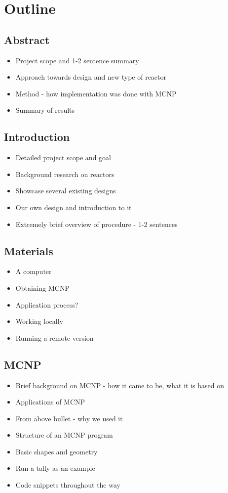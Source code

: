 \documentclass[12pt,a4paper]{article}
\begin{document}
\section*{Outline}
\renewcommand{\thesubsection}{\arabic{subsection}}
\subsection{Abstract}
\begin{itemize}
	\item Project scope and 1-2 sentence summary
	\item Approach towards design and new type of reactor
	\item Method - how implementation was done with MCNP
	\item Summary of results
\end{itemize}
\subsection{Introduction}
\begin{itemize}
	\item Detailed project scope and goal
	\item Background research on reactors
	\item Showcase several existing designs
	\item Our own design and introduction to it
	\item Extremely brief overview of procedure - 1-2 sentences
\end{itemize}
\subsection{Materials}
\begin{itemize}
	\item A computer
	\item Obtaining MCNP
	\item Application process?
	\item Working locally
	\item Running a remote version
\end{itemize}
\subsection{MCNP}
\begin{itemize}
	\item Brief background on MCNP - how it came to be, what it is based on
	\item Applications of MCNP
	\item From above bullet - why we used it
	\item Structure of an MCNP program
	\item Basic shapes and geometry
	\item Run a tally as an example
	\item Code snippets throughout the way
\end{itemize}
\end{document}
